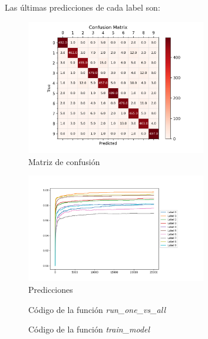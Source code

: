 \documentclass[6pt]{AiTex}
\begin{document}
Las últimas predicciones de cada label son:


\begin{figure}[H]
    \centering
    \includegraphics[width=0.7\textwidth]{./imagenes/confusion_matrix_one_vs_all.png}
    \caption{Matriz de confusión}
    \label{fig:matrix_a}
\end{figure}

\begin{figure}[H]
    \centering
    \includegraphics[width=0.7\textwidth]{./imagenes/predictions_one_vs_all.png}
    \caption{Predicciones}
    \label{fig:predictions_a}
\end{figure}

\begin{figure}[H]
    \centering
    
    \caption{Código de la función \textit{run\_one\_vs\_all}}
    \label{fig:run_one_vs_all}
\end{figure}

\begin{figure}[H]
    \centering
    
    \caption{Código de la función \textit{train\_model}}
    \label{fig:train_model}
\end{figure}
\end{document}
